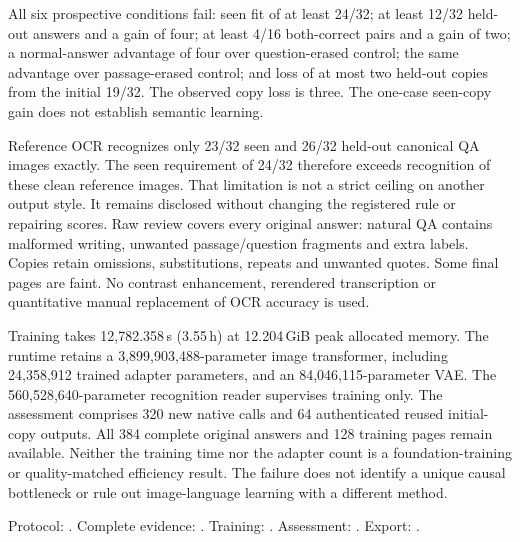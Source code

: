 \documentclass[10pt,a4paper]{article}
\begin{document}
All six prospective conditions fail: seen fit of at least 24/32; at least
12/32 held-out answers and a gain of four; at least 4/16 both-correct pairs
and a gain of two; a normal-answer advantage of four over question-erased
control; the same advantage over passage-erased control; and loss of at most
two held-out copies from the initial 19/32. The observed copy loss is three.
The one-case seen-copy gain does not establish semantic learning.

Reference OCR recognizes only 23/32 seen and 26/32 held-out canonical QA
images exactly. The seen requirement of 24/32 therefore exceeds recognition
of these clean reference images. That limitation is not a strict ceiling on
another output style. It remains disclosed without changing the registered
rule or repairing scores. Raw review covers every original answer: natural
QA contains malformed writing, unwanted passage/question fragments and extra
labels. Copies retain omissions, substitutions, repeats and unwanted quotes.
Some final pages are faint. No contrast enhancement, rerendered transcription
or quantitative manual replacement of OCR accuracy is used.

Training takes 12,782.358\,s (3.55\,h) at 12.204\,GiB peak allocated memory.
The runtime retains a 3,899,903,488-parameter image transformer, including
24,358,912 trained adapter parameters, and an 84,046,115-parameter VAE.
The 560,528,640-parameter recognition reader supervises training only.
The assessment comprises 320 new native calls and 64 authenticated reused
initial-copy outputs. All 384 complete original answers and 128 training
pages remain available. Neither the training time nor the adapter count is
a foundation-training or quality-matched efficiency result. The failure
does not identify a unique causal bottleneck or rule out image-language
learning with a different method.

{\footnotesize\raggedright
Protocol: .
Complete evidence: .
Training: .
Assessment: .
Export: .\par}


\clearpage
{}
\end{document}
